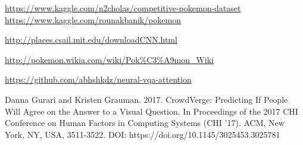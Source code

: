 \documentclass[journal, a4paper]{IEEEtran}
\begin{document}
\begin{thebibliography}{5}
	\url{https://www.kaggle.com/n2cholas/competitive-pokemon-dataset}
	\url{https://www.kaggle.com/rounakbanik/pokemon}
	
	\url{http://places.csail.mit.edu/downloadCNN.html}
	
	\url{http://pokemon.wikia.com/wiki/Pok%C3%A9mon_Wiki}
    
    \url{https://github.com/abhshkdz/neural-vqa-attention}
    
    Danna Gurari and Kristen Grauman. 2017. CrowdVerge: Predicting If People Will Agree on the Answer to a Visual Question. In Proceedings of the 2017 CHI Conference on Human Factors in Computing Systems (CHI '17). ACM, New York, NY, USA, 3511-3522. DOI: https://doi.org/10.1145/3025453.3025781
	
	

\end{thebibliography}

\end{document}
